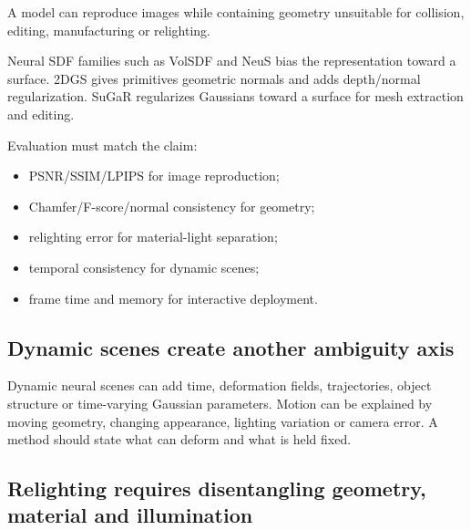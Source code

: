 \hypertarget{04-visual-computing-ii-ch035-view-synthesis-and-surface-reconstruction-are-different-objectives}{}

A model can reproduce images while containing geometry unsuitable for collision, editing, manufacturing or relighting.

Neural SDF families such as VolSDF and NeuS bias the representation toward a surface. 2DGS gives primitives geometric normals and adds depth/normal regularization. SuGaR regularizes Gaussians toward a surface for mesh extraction and editing.

Evaluation must match the claim:

\begin{itemize}
\tightlist
\item
  PSNR/SSIM/LPIPS for image reproduction;
\item
  Chamfer/F-score/normal consistency for geometry;
\item
  relighting error for material-light separation;
\item
  temporal consistency for dynamic scenes;
\item
  frame time and memory for interactive deployment.
\end{itemize}

\subsection{Dynamic scenes create another ambiguity axis}\label{04-visual-computing-ii-ch035-dynamic-scenes-create-another-ambiguity-axis}

\hypertarget{04-visual-computing-ii-ch035-dynamic-scenes-create-another-ambiguity-axis}{}

Dynamic neural scenes can add time, deformation fields, trajectories, object structure or time-varying Gaussian parameters. Motion can be explained by moving geometry, changing appearance, lighting variation or camera error. A method should state what can deform and what is held fixed.

\subsection{Relighting requires disentangling geometry, material and illumination}\label{04-visual-computing-ii-ch035-relighting-requires-disentangling-geometry-material-and-illumination}

\hypertarget{04-visual-computing-ii-ch035-relighting-requires-disentangling-geometry-material-and-illumination}{}

